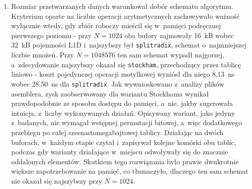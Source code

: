 \begin{enumerate}
    \item Rozmiar przetwarzanych danych warunkował dobór schematu algorytmu.
          Kryterium oparte na liczbie operacji arytmetycznych zachowywało ważność
          wyłącznie wtedy, gdy zbiór roboczy mieścił się w~pamięci podręcznej
          pierwszego poziomu - przy $N=1024$ oba bufory zajmowały 16~kB wobec
          32~kB pojemności L1D i~najszybszy był \texttt{splitradix}, schemat
          o~najmniejszej liczbie mnożeń. Przy $N=1048576$ ten sam schemat wypadł
          najgorzej, a~zdecydowanie najszybszy okazał się \texttt{stockham},
          przechodzący przez tablicę liniowo - koszt pojedynczej operacji
          motylkowej wyniósł dla niego 8,13~ns wobec 28,50~ns dla
          \texttt{splitradix}. Jak wywnioskowano z~analizy plików asemblera, zysk
          zaobserwowany dla wariantu Stockhama wynikał prawdopodobnie ze sposobu
          dostępu do pamięci, a~nie, jakby sugerowała intuicja, z~liczby
          wykonywanych działań. Opisywany wariant, jako jedyny z~badanych, nie
          wymagał wstępnej permutacji bitowej, a~więc dodatkowego przebiegu po
          całej szesnastomegabajtowej tablicy. Działając na dwóch buforach,
          w~każdym etapie czytał i~zapisywał kolejne komórki obu tablic, podczas
          gdy warianty działające w~miejscu odwoływały się do znacznie oddalonych
          elementów. Skutkiem tego rozwiązania było prawie dwukrotnie większe
          zapotrzebowanie na pamięć, co tłumaczyło, dlaczego ten sam schemat nie
          okazał się najszybszy przy $N=1024$.


\end{enumerate}
